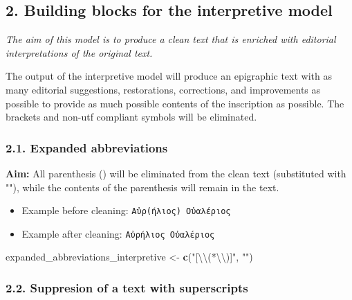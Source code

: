 \documentclass[]{article}
\newenvironment{Shaded}{\begin{snugshade}}{\end{snugshade}}
\newcommand{\CharTok}[1]{\textcolor[rgb]{0.31,0.60,0.02}{#1}}
\newcommand{\KeywordTok}[1]{\textcolor[rgb]{0.13,0.29,0.53}{\textbf{#1}}}
\newcommand{\NormalTok}[1]{#1}
\newcommand{\StringTok}[1]{\textcolor[rgb]{0.31,0.60,0.02}{#1}}
\providecommand{\tightlist}{%
  \setlength{\itemsep}{0pt}\setlength{\parskip}{0pt}}
\begin{document}
\hypertarget{building-blocks-for-the-interpretive-model}{%
\subsection{2. Building blocks for the interpretive
model}\label{building-blocks-for-the-interpretive-model}}

\emph{The aim of this model is to produce a clean text that is enriched
with editorial interpretations of the original text.}

The output of the interpretive model will produce an epigraphic text
with as many editorial suggestions, restorations, corrections, and
improvements as possible to provide as much possible contents of the
inscription as possible. The brackets and non-utf compliant symbols will
be eliminated.

\hypertarget{expanded-abbreviations-1}{%
\subsubsection{2.1. Expanded
abbreviations}\label{expanded-abbreviations-1}}

\textbf{Aim:} All parenthesis () will be eliminated from the clean text
(substituted with ""), while the contents of the parenthesis will remain
in the text.

\begin{itemize}
\tightlist
\item
  Example before cleaning: \texttt{Αὐρ(ήλιος)\ Οὐαλέριος}
\item
  Example after cleaning: \texttt{Αὐρήλιος\ Οὐαλέριος}
\end{itemize}

\begin{Shaded}
\begin{Highlighting}[]
\NormalTok{expanded_abbreviations_interpretive <-}\StringTok{ }\KeywordTok{c}\NormalTok{(}\StringTok{"[}\CharTok{\textbackslash{}\textbackslash{}}\StringTok{(*}\CharTok{\textbackslash{}\textbackslash{}}\StringTok{)]"}\NormalTok{, }\StringTok{""}\NormalTok{)}
\end{Highlighting}
\end{Shaded}

\hypertarget{suppresion-of-a-text-with-superscripts-1}{%
\subsubsection{2.2. Suppresion of a text with
superscripts}\label{suppresion-of-a-text-with-superscripts-1}}
\end{document}
